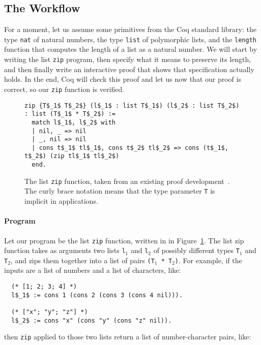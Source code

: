 \subsection{The Workflow}
\label{sec:mot-workflow}

For a moment, let us assume some primitives from the Coq standard library: the type \lstinline{nat} of natural numbers,
the type \lstinline{list} of polymorphic lists, and the \lstinline{length} function that computes the length of a list as a natural number.
We will start by writing the list \lstinline{zip} program, then specify what it means to preserve its length, and then finally
write an interactive proof that shows that specification actually holds.
In the end, Coq will check this proof and let us now that our proof is correct, so our \lstinline{zip} function is verified.

\begin{figure}
\begin{lstlisting}
zip {T$_1$ T$_2$} (l$_1$ : list T$_1$) (l$_2$ : list T$_2$) : list (T$_1$ * T$_2$) :=
  match l$_1$, l$_2$ with
  | nil, _ => nil
  | _, nil => nil
  | cons t$_1$ tl$_1$, cons t$_2$ tl$_2$ => cons (t$_1$, t$_2$) (zip tl$_1$ tl$_2$)
  end.
\end{lstlisting}
\caption{The list \lstinline{zip} function, taken from an existing proof development~\cite{hstocoqv}. The curly brace notation means that the type parameter \lstinline{T} is implicit in applications.} %
\label{fig:zip}
\end{figure}

\paragraph{Program} Let our program be the list \lstinline{zip} function, written in  in Figure~\ref{fig:zip}.
The list zip function takes as arguments two lists \lstinline{l}$_1$ and \lstinline{l}$_2$ of possibly different types \lstinline{T}$_1$ and \lstinline{T}$_2$, and zips them together into
a list of pairs \lstinline{(T}$_1$\lstinline{ * T}$_2$\lstinline{)}.
For example, if the inputs are a list of numbers and a list of characters, like:

\begin{lstlisting}
  (* [1; 2; 3; 4] *)
  l$_1$ := cons 1 (cons 2 (cons 3 (cons 4 nil))).

  (* ["x"; "y"; "z"] *)
  l$_2$ := cons "x" (cons "y" (cons "z" nil)).
\end{lstlisting}
then \lstinline{zip} applied to those two lists return a list of number-character pairs, like:

